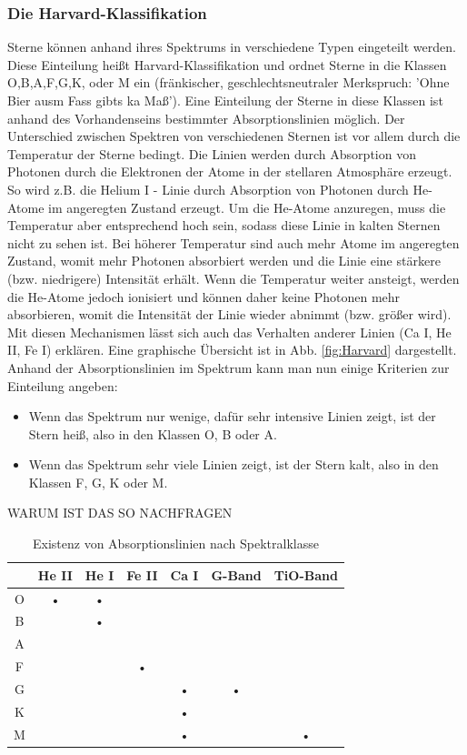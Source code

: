 \subsubsection{Die Harvard-Klassifikation}
Sterne können anhand ihres Spektrums in verschiedene Typen eingeteilt werden. Diese Einteilung heißt Harvard-Klassifikation und ordnet Sterne in die Klassen O,B,A,F,G,K, oder M ein (fränkischer, geschlechtsneutraler Merkspruch: 'Ohne Bier ausm Fass gibts ka Maß'). Eine Einteilung der Sterne in diese Klassen ist anhand des Vorhandenseins bestimmter Absorptionslinien möglich. Der Unterschied zwischen Spektren von verschiedenen Sternen ist vor allem durch die Temperatur der Sterne bedingt. Die Linien werden durch Absorption von Photonen durch die Elektronen der Atome in der stellaren Atmosphäre erzeugt. So wird z.B. die Helium I - Linie durch Absorption von Photonen durch He-Atome im angeregten Zustand erzeugt. Um die He-Atome anzuregen, muss die Temperatur aber entsprechend hoch sein, sodass diese Linie in kalten Sternen nicht zu sehen ist. Bei höherer Temperatur sind auch mehr Atome im angeregten Zustand, womit mehr Photonen absorbiert werden und die Linie eine stärkere (bzw. niedrigere) Intensität erhält. Wenn die Temperatur weiter ansteigt, werden die He-Atome jedoch ionisiert und können daher keine Photonen mehr absorbieren, womit die Intensität der Linie wieder abnimmt (bzw. größer wird). Mit diesen Mechanismen lässt sich auch das Verhalten anderer Linien (Ca I, He II, Fe I) erklären. Eine graphische Übersicht ist in Abb. \ref{fig:Harvard} dargestellt.
\\
Anhand der Absorptionslinien im Spektrum kann man nun einige Kriterien zur Einteilung angeben:
\begin{itemize}
\item Wenn das Spektrum nur wenige, dafür sehr intensive Linien zeigt, ist der Stern heiß, also in den Klassen O, B oder A.
\item Wenn das Spektrum sehr viele Linien zeigt, ist der Stern kalt, also in den Klassen F, G, K oder M.
\end{itemize}

WARUM IST DAS SO NACHFRAGEN

\begin{table}
\centering
\begin{tabular}{c|c|c|c|c|c|c}

 & He II & He I & Fe II & Ca I & G-Band & TiO-Band \\ 
\hline 
O & • & • &  &  &  &  \\ 
\hline 
B &  & • &  &  &  &  \\ 
\hline 
A &  &  &  &  &  &  \\ 
\hline 
F &  &  & • &  &  & \\ 
\hline 
G &  &  &  & • & • &  \\ 
\hline 
K &  &  &  & • &  &  \\ 
\hline 
M &  &  &  & • &  & • \\ 
\end{tabular}
\caption{Existenz von Absorptionslinien nach Spektralklasse}
\label{tab:Spektral}
\end{table}

